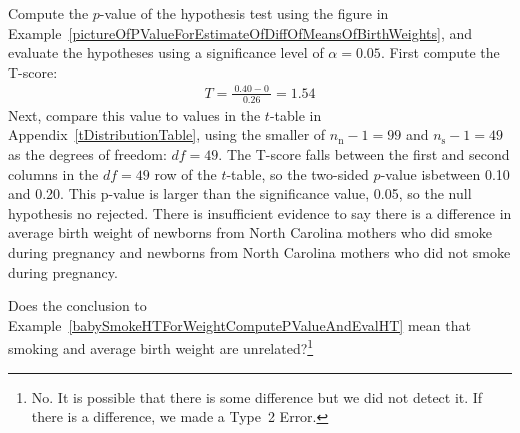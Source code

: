 \begin{example}{Compute the $p$-value of the hypothesis test using the figure in Example~\ref{pictureOfPValueForEstimateOfDiffOfMeansOfBirthWeights}, and evaluate the hypotheses using a significance level of $\alpha=0.05$.} \label{babySmokeHTForWeightComputePValueAndEvalHT}
First compute the T-score:
\begin{eqnarray*}
T = \frac{\ 0.40 - 0\ }{0.26} = 1.54
\end{eqnarray*}
Next, compare this value to values in the $t$-table in Appendix~\vref{tDistributionTable}, using the smaller of $n_{\text{n}} - 1 = 99$ and $n_{\text{s}} - 1 = 49$ as the degrees of freedom: $df = 49$. The T-score falls between the first and second columns in the $df = 49$ row of the $t$-table, so the two-sided $p$-value isbetween 0.10 and 0.20. This p-value is larger than the significance value, 0.05, so the null hypothesis no rejected. There is insufficient evidence to say there is a difference in average birth weight of newborns from North Carolina mothers who did smoke during pregnancy and newborns from North Carolina mothers who did not smoke during pregnancy.
\end{example}

\begin{exercise}
Does the conclusion to Example~\ref{babySmokeHTForWeightComputePValueAndEvalHT} mean that smoking and average birth weight are unrelated?\footnote{No. It is possible that there is some difference but we did not detect it. If there is a difference, we made a Type~2 Error.}
\end{exercise}





